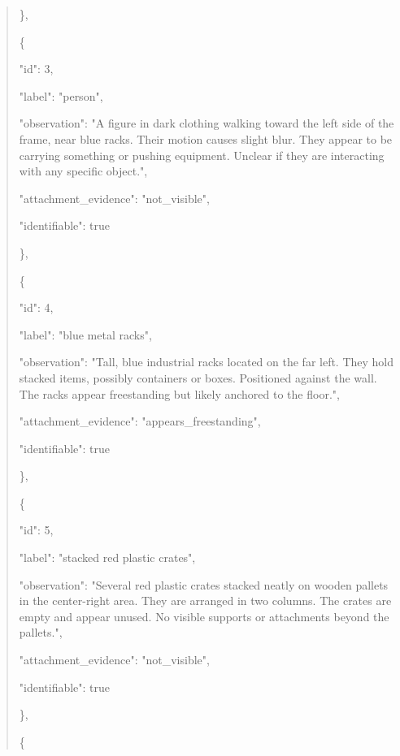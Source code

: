\documentclass[10pt,a4paper]{article}
\begin{document}
\begin{quote}
    \},\allowbreak{}\par
    \{\par
      "id":\allowbreak{} 3,\allowbreak{}\par
      "label":\allowbreak{} "person",\allowbreak{}\par
      "observation":\allowbreak{} "A figure in dark clothing walking toward the left side of the frame,\allowbreak{} near blue racks. Their motion causes slight blur. They appear to be carrying something or pushing equipment. Unclear if they are interacting with any specific object.",\allowbreak{}\par
      "attachment\_evidence":\allowbreak{} "not\_visible",\allowbreak{}\par
      "identifiable":\allowbreak{} true\par
    \},\allowbreak{}\par
    \{\par
      "id":\allowbreak{} 4,\allowbreak{}\par
      "label":\allowbreak{} "blue metal racks",\allowbreak{}\par
      "observation":\allowbreak{} "Tall,\allowbreak{} blue industrial racks located on the far left. They hold stacked items,\allowbreak{} possibly containers or boxes. Positioned against the wall. The racks appear freestanding but likely anchored to the floor.",\allowbreak{}\par
      "attachment\_evidence":\allowbreak{} "appears\_freestanding",\allowbreak{}\par
      "identifiable":\allowbreak{} true\par
    \},\allowbreak{}\par
    \{\par
      "id":\allowbreak{} 5,\allowbreak{}\par
      "label":\allowbreak{} "stacked red plastic crates",\allowbreak{}\par
      "observation":\allowbreak{} "Several red plastic crates stacked neatly on wooden pallets in the center-right area. They are arranged in two columns. The crates are empty and appear unused. No visible supports or attachments beyond the pallets.",\allowbreak{}\par
      "attachment\_evidence":\allowbreak{} "not\_visible",\allowbreak{}\par
      "identifiable":\allowbreak{} true\par
    \},\allowbreak{}\par
    \{\par

\end{quote}
\end{document}
